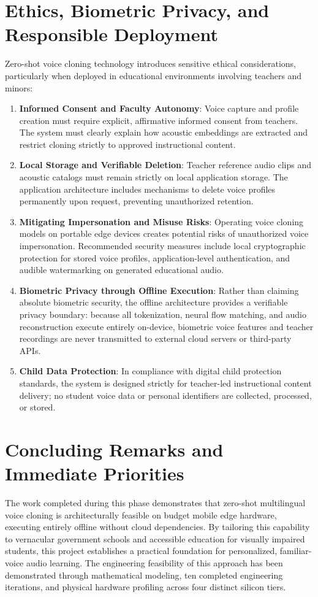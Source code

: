 \section{Ethics, Biometric Privacy, and Responsible Deployment}
\label{sec:ethics_privacy}
Zero-shot voice cloning technology introduces sensitive ethical considerations, particularly when deployed in educational environments involving teachers and minors:
\begin{enumerate}
    \item \textbf{Informed Consent and Faculty Autonomy}: Voice capture and profile creation must require explicit, affirmative informed consent from teachers. The system must clearly explain how acoustic embeddings are extracted and restrict cloning strictly to approved instructional content.
    \item \textbf{Local Storage and Verifiable Deletion}: Teacher reference audio clips and acoustic catalogs must remain strictly on local application storage. The application architecture includes mechanisms to delete voice profiles permanently upon request, preventing unauthorized retention.
    \item \textbf{Mitigating Impersonation and Misuse Risks}: Operating voice cloning models on portable edge devices creates potential risks of unauthorized voice impersonation. Recommended security measures include local cryptographic protection for stored voice profiles, application-level authentication, and audible watermarking on generated educational audio.
    \item \textbf{Biometric Privacy through Offline Execution}: Rather than claiming absolute biometric security, the offline architecture provides a verifiable privacy boundary: because all tokenization, neural flow matching, and audio reconstruction execute entirely on-device, biometric voice features and teacher recordings are never transmitted to external cloud servers or third-party APIs.
    \item \textbf{Child Data Protection}: In compliance with digital child protection standards, the system is designed strictly for teacher-led instructional content delivery; no student voice data or personal identifiers are collected, processed, or stored.
\end{enumerate}

\section{Concluding Remarks and Immediate Priorities}
The work completed during this phase demonstrates that zero-shot multilingual voice cloning is architecturally feasible on budget mobile edge hardware, executing entirely offline without cloud dependencies. By tailoring this capability to vernacular government schools and accessible education for visually impaired students, this project establishes a practical foundation for personalized, familiar-voice audio learning. The engineering feasibility of this approach has been demonstrated through mathematical modeling, ten completed engineering iterations, and physical hardware profiling across four distinct silicon tiers.

